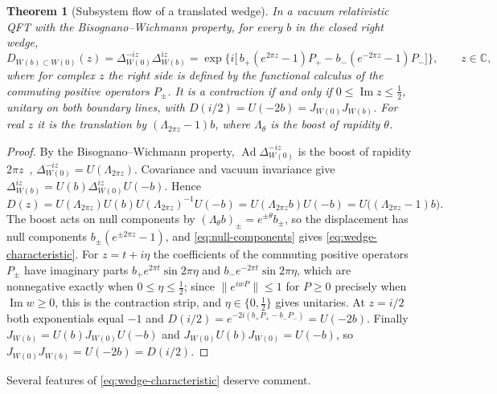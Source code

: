 \documentclass[a4paper,11pt]{article}
\newtheorem{theorem}{Theorem}
\theoremstyle{definition}
\begin{document}
\begin{theorem}[Subsystem flow of a translated wedge]
\label{thm:wedge-characteristic}
In a vacuum relativistic QFT with the Bisognano--Wichmann property, for every $b$ in the closed right wedge,
\begin{equation}
 D_{W(b)\subset W(0)}(z)=\Delta_{W(0)}^{-iz}\Delta_{W(b)}^{iz}
 =\exp\Big\{i\big[\,b_+(e^{2\pi z}-1)P_+-b_-(e^{-2\pi z}-1)P_-\big]\Big\},
 \qquad z\in\mathbb C ,
 \label{eq:wedge-characteristic}
\end{equation}
where for complex $z$ the right side is defined by the functional calculus of the commuting positive operators $P_\pm$. It is a contraction if and only if $0\le\operatorname{Im}z\le\tfrac12$, unitary on both boundary lines, with $D(i/2)=U(-2b)=J_{W(0)}J_{W(b)}$. For real $z$ it is the translation by $(\Lambda_{2\pi z}-1)b$, where $\Lambda_\theta$ is the boost of rapidity $\theta$.
\end{theorem}
\begin{proof}
By the Bisognano--Wichmann property, $\operatorname{Ad}\Delta_{W(0)}^{-iz}$ is the boost of rapidity $2\pi z$~\cite{bisognanowichmann}, $\Delta_{W(0)}^{-iz}=U(\Lambda_{2\pi z})$. Covariance and vacuum invariance give $\Delta_{W(b)}^{iz}=U(b)\Delta_{W(0)}^{iz}U(-b)$. Hence
\[
 D(z)=U(\Lambda_{2\pi z})U(b)U(\Lambda_{2\pi z})^{-1}U(-b)=U(\Lambda_{2\pi z}b)U(-b)=U\bigl((\Lambda_{2\pi z}-1)b\bigr).
\]
The boost acts on null components by $(\Lambda_\theta b)_\pm=e^{\pm\theta}b_\pm$, so the displacement has null components $b_\pm(e^{\pm2\pi z}-1)$, and \eqref{eq:null-components} gives \eqref{eq:wedge-characteristic}. For $z=t+i\eta$ the coefficients of the commuting positive operators $P_\pm$ have imaginary parts $b_+e^{2\pi t}\sin2\pi\eta$ and $b_-e^{-2\pi t}\sin2\pi\eta$, which are nonnegative exactly when $0\le\eta\le\tfrac12$; since $\|e^{iwP}\|\le1$ for $P\ge0$ precisely when $\operatorname{Im}w\ge0$, this is the contraction strip, and $\eta\in\{0,\tfrac12\}$ gives unitaries. At $z=i/2$ both exponentials equal $-1$ and $D(i/2)=e^{-2i(b_+P_+-b_-P_-)}=U(-2b)$. Finally $J_{W(b)}=U(b)J_{W(0)}U(-b)$ and $J_{W(0)}U(b)J_{W(0)}=U(-b)$, so $J_{W(0)}J_{W(b)}=U(-2b) = D(i/2)$.
\end{proof}

Several features of \eqref{eq:wedge-characteristic} deserve comment.
\end{document}
